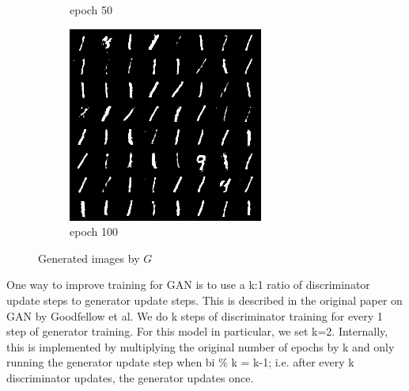\documentclass[a4paper]{article}
\theoremstyle{definition}
\newenvironment{soln}{
	\leavevmode\color{blue}\ignorespaces
}{}
\begin{document}
\begin{enumerate} [label=(\alph*)]
\begin{soln}
\begin{figure}[H]
\begin{subfigure}[b]{0.3\textwidth}
    				\caption{epoch 50}
    			\end{subfigure}
    			\hfill
    			\begin{subfigure}[b]{0.3\textwidth}
    				\centering
    				\includegraphics[width=\textwidth]{hw6/1.c/1_c_gen_img200.png}
    				\caption{epoch 100}
    			\end{subfigure}
    			\caption{Generated images by $G$}
    			\label{fig:three graphs}
    		\end{figure}

                One way to improve training for GAN is to use a k:1 ratio of discriminator update steps to generator update steps. This is described in the original paper on GAN by Goodfellow et al. We do k steps of discriminator training for every 1 step of generator training. For this model in particular, we set k=2.
                Internally, this is implemented by multiplying the original number of epochs by k and only running the generator update step when bi \% k = k-1; i.e. after every k discriminator updates, the generator updates once.
                

\end{soln}
\end{enumerate}
\end{document}
